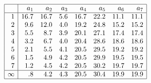 \documentclass{standalone}
\begin{document}
$%
\begin{array}{|r|rrrrrrr|} \hline
& a_1 & a_2 & a_3 & a_4 & a_5 & a_6 & a_7 \\
\hline
 1 &16.7 &16.7 & 5.6 & 16.7 & 22.2 & 11.1 & 11.1 \\
 2 & 9.6 &12.0 & 4.0 & 19.2 & 24.8 & 15.2 & 15.2 \\
 3 & 5.5 & 8.7 & 3.9 & 20.1 & 27.1 & 17.4 & 17.4 \\
 4 & 3.2 & 6.7 & 4.0 & 20.4 & 28.6 & 18.6 & 18.6 \\
 5 & 2.1 & 5.5 & 4.1 & 20.5 & 29.5 & 19.2 & 19.2 \\
 6 & 1.5 & 4.9 & 4.2 & 20.5 & 29.9 & 19.5 & 19.5 \\
 7 & 1.2 & 4.5 & 4.2 & 20.5 & 30.2 & 19.7 & 19.7 \\
\hline
\infty &  .8 & 4.2 & 4.3 & 20.5 & 30.4 & 19.9 & 19.9 \\
\hline
\end{array}
$
\end{document}
